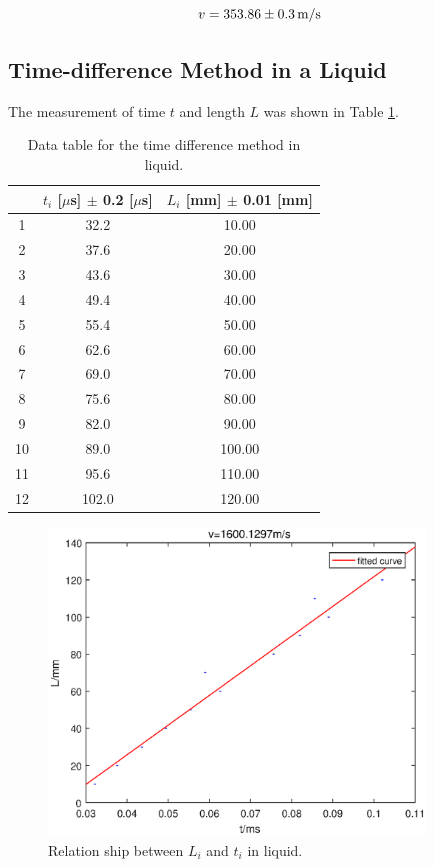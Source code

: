 \documentclass{article}
\begin{document}
$$v=353.86\pm0.3\,\rm{m/s}$$

\newpage

\subsection{Time-difference Method in a Liquid}


The measurement of time $t$ and length $L$ was shown in Table \ref{tab-4}.

\begin{table}[!h]
\begin{center}
\begin{tabular}{|c|c|c|}
\hline
& $t_i$ [$\mu$s] $\pm$ 0.2 [$\mu$s] & $L_i$ [mm] $\pm$ 0.01 [mm] \\
\hline
1 & 32.2 & 10.00 \\
2 & 37.6 & 20.00 \\
3 & 43.6 & 30.00 \\
4 & 49.4 & 40.00 \\
5 & 55.4 & 50.00 \\
6 & 62.6 & 60.00 \\
7 & 69.0 & 70.00 \\
8 & 75.6 & 80.00 \\
9 & 82.0 & 90.00 \\
10& 89.0 & 100.00 \\
11& 95.6 & 110.00 \\
12& 102.0& 120.00 \\
\hline
\end{tabular}
\caption{Data table for the time difference method in liquid.}
\label{tab-4}
\end{center}
\end{table}

\begin{figure}[!h]
	\centering
	\includegraphics[width=10cm]{fig-4.eps}
	\caption{Relation ship between $L_i$ and $t_i$ in liquid.
	\label{fig-4}}
\end{figure}
\end{document}
